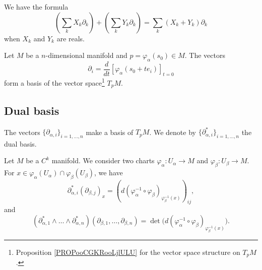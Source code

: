 \begin{proposition}		\label{PROPooCGKRooLjlULU}
	We have the formula
	\begin{equation}
		\left( \sum_kX_k\partial_k \right)+\left( \sum_kY_k\partial_k \right)=\sum_k (X_k+Y_k)\partial_k
	\end{equation}
	when \( X_k\) and \( Y_k\) are reals.
\end{proposition}

\begin{proposition}		\label{PROPooAAAXooKAMsfK}
	Let \( M\) be a \( n\)-dimensional manifold and \( p=\varphi_{\alpha}(s_0)\in M\). The vectors
	\begin{equation}
		\partial_i=\frac{d}{dt} \left[ \varphi_{\alpha}(s_0+te_i)  \right]_{t=0}
	\end{equation}
	form a basis of the vector space\footnote{Proposition \ref{PROPooCGKRooLjlULU} for the vector space structure on \( T_pM\).} \( T_pM\).
\end{proposition}

\subsection{Dual basis}


\begin{definition}		\label{DEFooZNHIooKIpND}
	The vectors \( \{ \partial_{\alpha,i} \}_{i=1,\ldots,n}\) make a basis of \( T_pM\). We denote by \( \{ \partial^*_{\alpha, i} \}_{i=1,\ldots,n}\) the dual basis.
\end{definition}

\begin{lemma}		\label{LEMooSZTOooBIzMCc}
	Let \( M\) be a \( C^k\) manifold. We consider two charts \(\varphi_{\alpha} \colon U_{\alpha}\to M  \) and \(\varphi_{\beta} \colon U_{\beta}\to M  \). For \( x\in \varphi_{\alpha}(U_{\alpha})\cap \varphi_{\beta}(U_{\beta})\), we have
	\begin{equation}		\label{EQooQNRRooKkCkLE}
		\partial^*_{\alpha,i}(\partial_{\beta,j})_x=(d(\varphi_{\alpha}^{-1}\circ \varphi_{\beta})_{\varphi_{\beta}^{-1}(x)})_{ij},
	\end{equation}
	and
	\begin{equation}		\label{EQooAGFKooWwWdAf}
		(\partial_{\alpha, 1}^*\wedge\ldots \wedge\partial_{\alpha,n}^*)(\partial_{\beta,1},\ldots,\partial_{\beta,n})=\det\big( d(\varphi_{\alpha}^{-1}\circ\varphi_{\beta})_{\varphi_{\beta}^{-1}(x)} \big).
	\end{equation}
\end{lemma}

